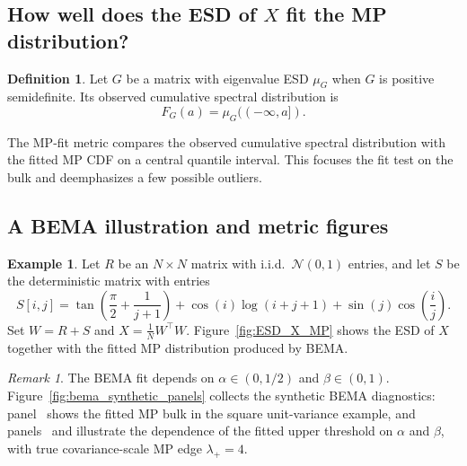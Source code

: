 \documentclass[11pt]{article}
\theoremstyle{plain}
\theoremstyle{definition}
\newtheorem{defn}[thm]{Definition}
\newtheorem{ex}[thm]{Example}
\theoremstyle{remark}
\newtheorem{rem}[thm]{Remark}
\newcommand{\1}{\mathbf{1}}
\begin{document}
\subsection{How well does the ESD of \texorpdfstring{\(X\)}{X} fit the MP distribution?}
\label{Alignment_Evaluation}

\begin{defn}
\label{ECS_Reformulated}
Let \(G\) be a matrix with eigenvalue ESD \(\mu_G\) when \(G\) is positive semidefinite. Its observed cumulative spectral distribution is
\[
F_G(a)=\mu_G((-\infty,a]).
\]
\end{defn}

The MP-fit metric compares the observed cumulative spectral distribution with the fitted MP CDF on a central quantile interval. This focuses the fit test on the bulk and deemphasizes a few possible outliers.

\subsection{A BEMA illustration and metric figures}
\label{alpha_and_metrics}

\begin{ex}
\label{deterministic_random}
Let \(R\) be an \(N\times N\) matrix with i.i.d.\ \(\mathcal N(0,1)\) entries, and let \(S\) be the deterministic matrix with entries
\[
S[i,j]=\tan\!\left(\frac{\pi}{2}+\frac{1}{j+1}\right)+\cos(i)\log(i+j+1)+\sin(j)\cos\!\left(\frac{i}{j}\right).
\]
Set \(W=R+S\) and \(X=\frac1N W^\top W\). Figure~\ref{fig:ESD_X_MP} shows the ESD of \(X\) together with the fitted MP distribution produced by BEMA.
\end{ex}

\begin{rem}
\label{alpha_hyper}
The BEMA fit depends on \(\alpha\in(0,1/2)\) and \(\beta\in(0,1)\). Figure~\ref{fig:bema_synthetic_panels} collects the synthetic BEMA diagnostics: panel~ shows the fitted MP bulk in the square unit-variance example, and panels~ and  illustrate the dependence of the fitted upper threshold on \(\alpha\) and \(\beta\), with true covariance-scale MP edge \(\lambda_+=4\).
\end{rem}
\end{document}
